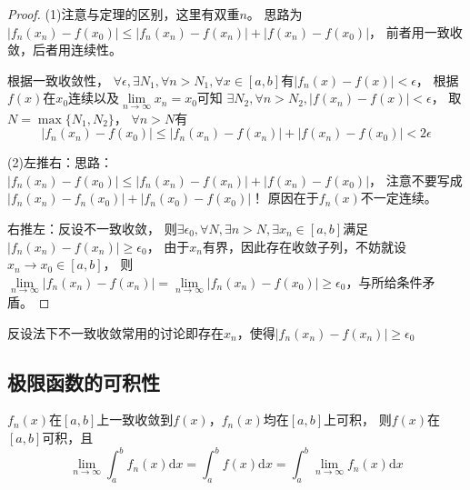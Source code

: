 \begin{proof}
  (1)注意与定理的区别，这里有双重$n$。
  思路为$|f_n(x_n) - f(x_0)| \leq |f_n(x_n) - f(x_n)| + |f(x_n) - f(x_0)|$，
  前者用一致收敛，后者用连续性。

  根据一致收敛性，
  $\forall \epsilon, \exists N_1, \forall n > N_1, \forall x \in [a,b]$有$|f_n(x) - f(x)| < \epsilon$，
  根据$f(x)$在$x_0$连续以及$\lim \limits _{n \rightarrow \infty} x_n = x_0$可知
  $\exists N_2, \forall n > N_2, |f(x_n) - f(x)|< \epsilon$，
  取$N = \max \{N_1, N_2\}$，
  $\forall n > N$有
  \begin{equation*}
    |f_n(x_n) - f(x_0)| \leq |f_n(x_n) - f(x_n)| + |f(x_n) - f(x_0)| < 2\epsilon
  \end{equation*}

  
  (2)左推右：思路：$|f_n(x_n) - f(x_0)| \leq |f_n(x_n) - f(x_n)| + |f(x_n) - f(x_0)|$，
  注意不要写成$|f_n(x_n) - f_n(x_0)| + |f_n(x_0) - f(x_0)|$！
  原因在于$f_n(x)$不一定连续。

  右推左：反设不一致收敛，
  则$\exists \epsilon_0, \forall N, \exists n > N, \exists x_n \in [a,b]$满足$|f_n(x_n) - f(x_n)| \geq \epsilon_0$，
  由于$x_n$有界，因此存在收敛子列，不妨就设$x_n \rightarrow x_0 \in [a,b]$，
  则$\lim \limits _{n \rightarrow \infty} |f_n(x_n) - f(x_n)| = \lim \limits _{n \rightarrow \infty} |f_n(x_n) - f(x_0)| \geq \epsilon_0$，与所给条件矛盾。
\end{proof}

\begin{note}
  反设法下不一致收敛常用的讨论即存在$x_n$，使得$|f_n(x_n) - f(x_n)| \geq \epsilon_0$
\end{note}


\subsection{极限函数的可积性}

\begin{theorem}[可积性]
  $f_n(x)$在$[a,b]$上一致收敛到$f(x)$，$f_n(x)$均在$[a,b]$上可积，
  则$f(x)$在$[a,b]$可积，且
  \begin{equation*}
    \lim \limits _{n \rightarrow \infty} \int_a^b f_n(x)\mathrm{d}x = \int_a^b f(x)\mathrm{d}x = \int_a^b \lim \limits _{n \rightarrow \infty} f_n(x)\mathrm{d}x
  \end{equation*}
\end{theorem}

